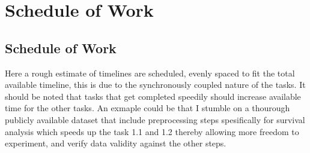 \chapter{Schedule of Work}
\label{Chapter3} %





\section{Schedule of Work}

\noindent Here a rough estimate of timelines are scheduled, evenly spaced to fit the total available timeline, this is due to the synchronously coupled nature of the tasks. It should be noted that tasks that get completed speedily should increase available time for the other tasks. An exmaple could be that I stumble on a thourough publicly available dataset that include preprocessing steps spesifically for survival analysis which speeds up the task 1.1 and 1.2 thereby allowing more freedom to experiment, and verify data validity against the other steps.


